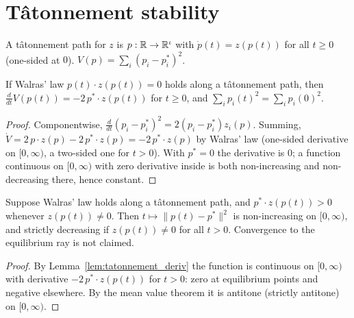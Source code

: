 \section{Tâtonnement stability}
\label{sec:tatonnement}

\begin{definition}
\label{def:tatonnement}
\leanok
A tâtonnement path for $z$ is $p : \mathbb{R} \to \mathbb{R}^\iota$ with $\dot p(t) = z(p(t))$ for all $t \ge 0$ (one-sided at $0$). $V(p) = \sum_i (p_i - p^*_i)^2$.
\end{definition}

\begin{lemma}
\label{lem:tatonnement_deriv}
\leanok
{}
If Walras' law $p(t) \cdot z(p(t)) = 0$ holds along a tâtonnement path, then
$\frac{d}{dt} V(p(t)) = -2\, p^* \cdot z(p(t))$ for $t \ge 0$, and $\sum_i p_i(t)^2 = \sum_i p_i(0)^2$.
\end{lemma}
\begin{proof}
\leanok
Componentwise, $\frac{d}{dt}(p_i - p^*_i)^2 = 2(p_i - p^*_i) z_i(p)$. Summing,
$\dot V = 2\, p \cdot z(p) - 2\, p^* \cdot z(p) = -2\, p^* \cdot z(p)$ by Walras' law (one-sided derivative on
$[0, \infty)$, a two-sided one for $t > 0$). With $p^* = 0$ the derivative is $0$; a function continuous on $[0,\infty)$
with zero derivative inside is both non-increasing and non-decreasing there, hence constant.
\end{proof}

\begin{theorem}
\label{thm:tatonnement}
\leanok
{}
Suppose Walras' law holds along a tâtonnement path, and $p^* \cdot z(p(t)) > 0$ whenever $z(p(t)) \ne 0$. Then
$t \mapsto \|p(t) - p^*\|^2$ is non-increasing on $[0, \infty)$, and strictly decreasing if $z(p(t)) \ne 0$ for all
$t > 0$.
Convergence to the equilibrium ray is not claimed.
\end{theorem}
\begin{proof}
\leanok
By Lemma~\ref{lem:tatonnement_deriv} the function is continuous on $[0,\infty)$ with derivative $-2\, p^* \cdot z(p(t))$
for $t > 0$: zero at equilibrium points and negative elsewhere. By the mean value theorem it is antitone (strictly
antitone) on $[0, \infty)$.
\end{proof}


